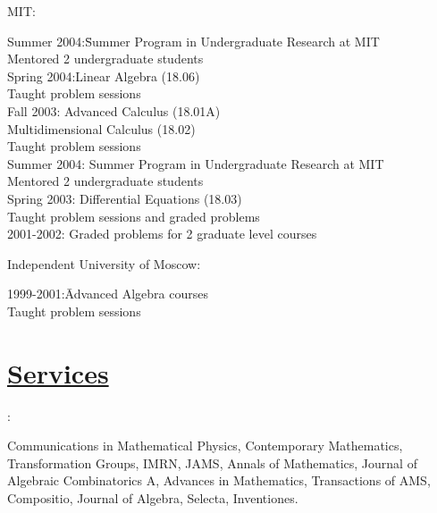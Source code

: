 \documentclass[11pt]{amsart}
\theoremstyle{plain}
\theoremstyle{definition}
\theoremstyle{remark}
\begin{document}
\medskip \noindent MIT:

\begin{tabbing}
Summer 2004:\quad\=Summer Program in Undergraduate Research at
                   MIT\\\>
Mentored 2 undergraduate students \\
Spring 2004:\>Linear Algebra (18.06)\\ \> Taught problem sessions\\
Fall 2003:\>
          Advanced Calculus (18.01A)\\ \>
         Multidimensional Calculus (18.02)\\ \>
         Taught problem sessions\\
Summer 2004: \> Summer
Program in Undergraduate Research at MIT\\
\> Mentored 2 undergraduate students\\
Spring 2003:\> Differential Equations (18.03) \\ \> Taught problem
sessions and graded problems\\
2001-2002:\> Graded problems for 2 graduate level courses
\end{tabbing}

\medskip
\noindent Independent University of Moscow:
\begin{tabbing}
1999-2001:\quad\quad\quad\=  Advanced Algebra courses\\ \> Taught
problem sessions\\
\end{tabbing}











\section*{\Large \underline{Services}}

:

\medskip

\medskip

 Communications in Mathematical Physics, Contemporary
Mathematics, Transformation Groups, IMRN, JAMS, Annals of Mathematics, Journal of Algebraic Combinatorics A, Advances in Mathematics, Transactions of AMS, Compositio, Journal of Algebra, Selecta, Inventiones.
\medskip  
\end{document}

